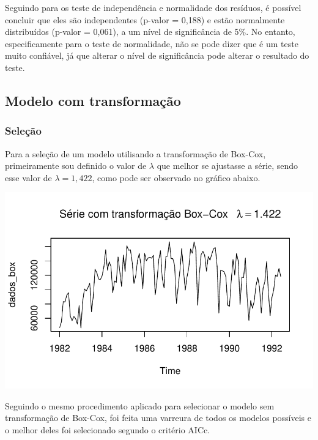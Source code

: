 \documentclass[
  letterpaper,
  DIV=11,
  numbers=noendperiod]{scrartcl}
\begin{document}
Seguindo para os teste de independência e normalidade dos resíduos, é
possível concluir que eles são independentes (p-valor = 0,188) e estão
normalmente distribuídos (p-valor = 0,061), a um nível de significância
de 5\%. No entanto, especificamente para o teste de normalidade, não se
pode dizer que é um teste muito confiável, já que alterar o nível de
significância pode alterar o resultado do teste.

\hypertarget{modelo-com-transformauxe7uxe3o}{%
\subsection{Modelo com
transformação}\label{modelo-com-transformauxe7uxe3o}}

\hypertarget{seleuxe7uxe3o}{%
\subsubsection{Seleção}\label{seleuxe7uxe3o}}

Para a seleção de um modelo utilisando a transformação de Box-Cox,
primeiramente sou definido o valor de \(\lambda\) que melhor se
ajustasse a série, sendo esse valor de \(\lambda = 1,422\), como pode
ser observado no gráfico abaixo.

\includegraphics{T2_grupo10_files/figure-pdf/ETS-com-transf-1.pdf}

Seguindo o mesmo procedimento aplicado para selecionar o modelo sem
transformação de Box-Cox, foi feita uma varreura de todos os modelos
possíveis e o melhor deles foi selecionado segundo o critério AICc.
\end{document}
